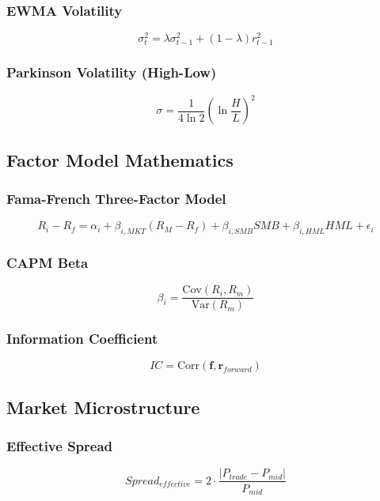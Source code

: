 \documentclass[11pt,letterpaper]{book}
\newcommand{\Var}{\mathrm{Var}}
\newcommand{\Cov}{\mathrm{Cov}}
\newcommand{\Corr}{\mathrm{Corr}}
\begin{document}
\subsubsection{EWMA Volatility}
\begin{equation}
\sigma_t^2 = \lambda \sigma_{t-1}^2 + (1-\lambda) r_{t-1}^2
\end{equation}

\subsubsection{Parkinson Volatility (High-Low)}
\begin{equation}
\sigma = \frac{1}{4 \ln 2} \left( \ln \frac{H}{L} \right)^2
\end{equation}

\subsection{Factor Model Mathematics}

\subsubsection{Fama-French Three-Factor Model}
\begin{equation}
R_i - R_f = \alpha_i + \beta_{i,MKT}(R_M - R_f) + \beta_{i,SMB}SMB + \beta_{i,HML}HML + \epsilon_i
\end{equation}

\subsubsection{CAPM Beta}
\begin{equation}
\beta_i = \frac{\Cov(R_i, R_m)}{\Var(R_m)}
\end{equation}

\subsubsection{Information Coefficient}
\begin{equation}
IC = \Corr(\mathbf{f}, \mathbf{r}_{forward})
\end{equation}

\subsection{Market Microstructure}

\subsubsection{Effective Spread}
\begin{equation}
Spread_{effective} = 2 \cdot \frac{|P_{trade} - P_{mid}|}{P_{mid}}
\end{equation}
\end{document}
